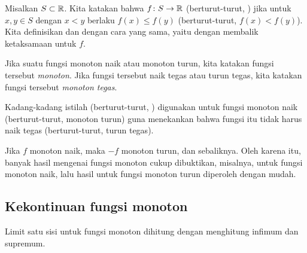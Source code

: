 

\begin{defn}
Misalkan $S \subset {\mathbb{R}}$.
Kita katakan bahwa $f \colon S \to {\mathbb{R}}$ \emph{}
(berturut-turut, \emph{}) jika untuk $x,y \in S$ dengan
$x < y$ berlaku $f(x) \leq f(y)$ (berturut-turut, $f(x) < f(y)$).
Kita definisikan
\emph{} dan
\emph{} dengan cara yang sama, yaitu dengan membalik
ketaksamaan untuk $f$.

Jika suatu fungsi monoton naik atau monoton turun, kita katakan fungsi tersebut
\emph{monoton}.  Jika fungsi tersebut
naik tegas atau turun tegas, kita katakan fungsi tersebut
\emph{monoton tegas}.
\end{defn}

Kadang-kadang istilah \emph{}
(berturut-turut, \emph{}) digunakan
untuk fungsi monoton naik (berturut-turut, monoton turun) guna menekankan bahwa fungsi itu tidak
harus naik tegas (berturut-turut, turun tegas).

Jika $f$ monoton naik, maka $-f$ monoton turun, dan sebaliknya.  Oleh karena itu,
banyak hasil mengenai fungsi monoton cukup dibuktikan, misalnya, untuk fungsi
monoton naik, lalu hasil untuk fungsi monoton turun diperoleh dengan mudah.

\subsection{Kekontinuan fungsi monoton}

Limit satu sisi untuk fungsi monoton dihitung
dengan menghitung infimum dan supremum.

